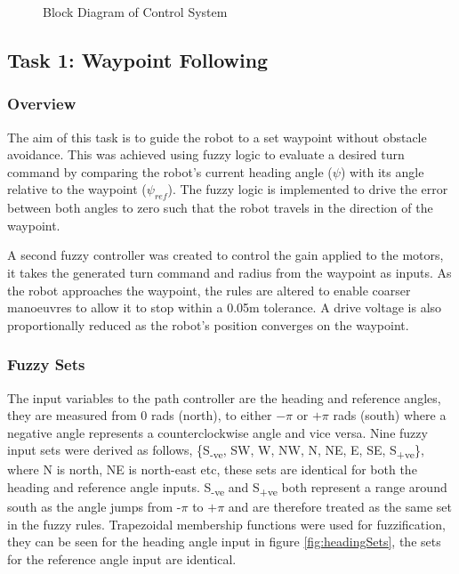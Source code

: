 \documentclass[10pt]{article}
\begin{document}
\begin{figure}[H]
    \centering
    \caption{Block Diagram of Control System}
    \label{fig:system}
\end{figure}



\subsection{Task 1: Waypoint Following}
\subsubsection{Overview}
The aim of this task is to guide the robot to a set waypoint without obstacle avoidance.
This was achieved using fuzzy logic to evaluate a desired turn command by comparing the robot's current heading angle ($\psi$) with its angle relative to the waypoint ($\psi_{ref}$).
The fuzzy logic is implemented to drive the error between both angles to zero such that the robot travels in the direction of the waypoint.
 
\medskip
A second fuzzy controller was created to control the gain applied to the motors, it takes the generated turn command and radius from the waypoint as inputs.
As the robot approaches the waypoint, the rules are altered to enable coarser manoeuvres to allow it to stop within a 0.05m tolerance.
A drive voltage is also proportionally reduced as the robot's position converges on the waypoint. 

\subsubsection{Fuzzy Sets}

The input variables to the path controller are the heading and reference angles, they are measured from 0 rads (north), to either $-\pi$ or $+\pi$ rads (south) where a negative angle represents a counterclockwise angle and vice versa.
Nine fuzzy input sets were derived as follows, \{S\textsubscript{-ve}, SW, W, NW, N, NE, E, SE, S\textsubscript{+ve}\}, where N is north, NE is north-east etc, these sets are identical for both the heading and reference angle inputs.
S\textsubscript{-ve} and S\textsubscript{+ve} both represent a range around south as the angle jumps from -$\pi$ to $+\pi$ and are therefore treated as the same set in the fuzzy rules. 
Trapezoidal membership functions were used for fuzzification, they can be seen for the heading angle input in figure \ref{fig:headingSets}, the sets for the reference angle input are identical.
\end{document}
